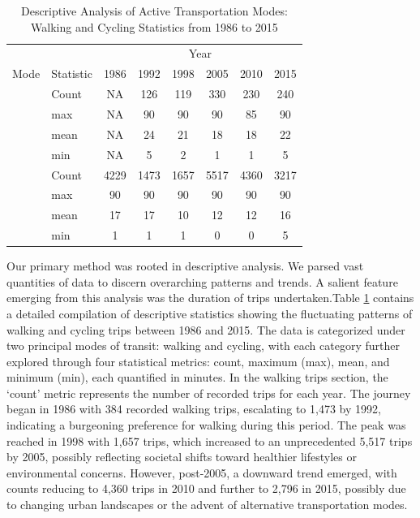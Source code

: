 \documentclass[
11pt, %
oneside, %
english, %
singlespacing, %
]{macthesis} %
\begin{document}
\begin{longtable}[t]{>{}llcccccc}
\caption{\label{tab:ch03-make-table-01}\label{tab:ch03-table-01}Descriptive Analysis of Active Transportation Modes: Walking and Cycling Statistics from 1986 to 2015}\\
\toprule
\multicolumn{2}{c}{ } & \multicolumn{6}{c}{Year} \\
\cmidrule(l{3pt}r{3pt}){3-8}
Mode & Statistic & 1986 & 1992 & 1998 & 2005 & 2010 & 2015\\
\midrule
 & Count & NA & 126 & 119 & 330 & 230 & 240\\
\nopagebreak
 & max & NA & 90 & 90 & 90 & 85 & 90\\
\nopagebreak
 & mean & NA & 24 & 21 & 18 & 18 & 22\\
\nopagebreak
\multirow[t]{-4}{*}{\raggedright\arraybackslash \textbf{cycling}} & min & NA & 5 & 2 & 1 & 1 & 5\\
\cmidrule{1-8}\pagebreak[0]
 & Count & 4229 & 1473 & 1657 & 5517 & 4360 & 3217\\
\nopagebreak
 & max & 90 & 90 & 90 & 90 & 90 & 90\\
\nopagebreak
 & mean & 17 & 17 & 10 & 12 & 12 & 16\\
\nopagebreak
\multirow[t]{-4}{*}{\raggedright\arraybackslash \textbf{walking}} & min & 1 & 1 & 1 & 0 & 0 & 5\\
\bottomrule
\end{longtable}
\endgroup{}

Our primary method was rooted in descriptive analysis. We parsed vast quantities of data to discern overarching patterns and trends. A salient feature emerging from this analysis was the duration of trips undertaken.Table \ref{tab:ch03-table-01} contains a detailed compilation of descriptive statistics showing the fluctuating patterns of walking and cycling trips between 1986 and 2015. The data is categorized under two principal modes of transit: walking and cycling, with each category further explored through four statistical metrics: count, maximum (max), mean, and minimum (min), each quantified in minutes. In the walking trips section, the `count' metric represents the number of recorded trips for each year. The journey began in 1986 with 384 recorded walking trips, escalating to 1,473 by 1992, indicating a burgeoning preference for walking during this period. The peak was reached in 1998 with 1,657 trips, which increased to an unprecedented 5,517 trips by 2005, possibly reflecting societal shifts toward healthier lifestyles or environmental concerns. However, post-2005, a downward trend emerged, with counts reducing to 4,360 trips in 2010 and further to 2,796 in 2015, possibly due to changing urban landscapes or the advent of alternative transportation modes.
\end{document}
